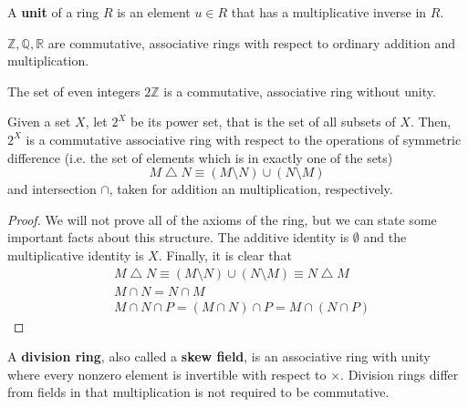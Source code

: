 \documentclass{article}
\begin{document}
    \begin{definition}
      A \textbf{unit} of a ring $R$ is an element $u \in R$ that has a multiplicative inverse in $R$. 
    \end{definition}

    \begin{example}
      $\mathbb{Z}, \mathbb{Q}, \mathbb{R}$ are commutative, associative rings with respect to ordinary addition and multiplication.
    \end{example}

    \begin{example}
      The set of even integers $2\mathbb{Z}$ is a commutative, associative ring without unity.
    \end{example}

    \begin{proposition}
      Given a set $X$, let $2^X$ be its power set, that is the set of all subsets of $X$. Then, $2^X$ is a commutative associative ring with respect to the operations of symmetric difference (i.e. the set of elements which is in exactly one of the sets) 
      \begin{equation}
        M \bigtriangleup N \equiv (M \setminus N) \cup (N \setminus M)
      \end{equation}
      and intersection $\cap$, taken for addition an multiplication, respectively. 
    \end{proposition}
    \begin{proof}
      We will not prove all of the axioms of the ring, but we can state some important facts about this structure. The additive identity is $\emptyset$ and the multiplicative identity is $X$. Finally, it is clear that 
      \begin{align*}
        & M \bigtriangleup N \equiv (M \setminus N) \cup (N \setminus M) \equiv N \bigtriangleup M \\
        & M \cap N = N \cap M \\
        & M \cap N \cap P = (M \cap N) \cap P = M \cap (N \cap P)
      \end{align*}
    \end{proof}

    \begin{example}
      A \textbf{division ring}, also called a \textbf{skew field}, is an associative ring with unity where every nonzero element is invertible with respect to $\times$. Division rings differ from fields in that multiplication is not required to be commutative. 
    \end{example}
\end{document}
